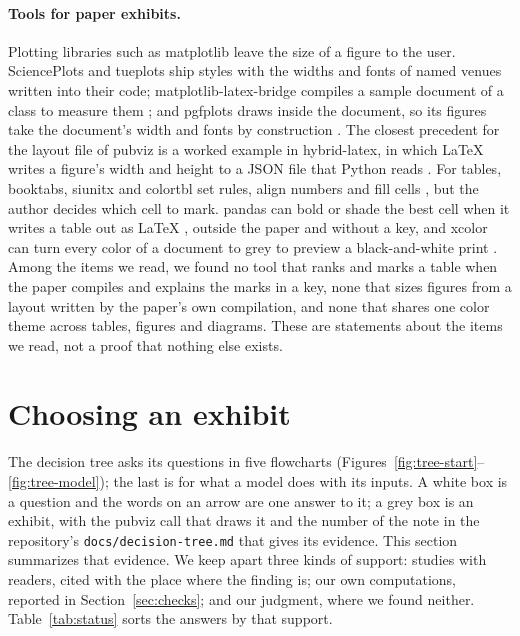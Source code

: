\documentclass[11pt]{article}
\newcommand\code[1]{\texttt{#1}}
\begin{document}
\paragraph{Tools for paper exhibits.} Plotting libraries such as matplotlib
\citep{hunter2007matplotlib} leave the size of a figure to the user.
SciencePlots and tueplots \citep{garrett_scienceplots,kramer_tueplots} ship
styles with the widths and fonts of named venues written into their code;
matplotlib-latex-bridge compiles a sample document of a class to measure
them \citep{vannucci_mlb}; and pgfplots draws inside the document, so its
figures take the document's width and fonts by construction
\citep{feuersaenger2026pgfplots}. The closest precedent for the layout file of
pubviz is a worked example in hybrid-latex, in which LaTeX writes a
figure's width and height to a JSON file that Python reads
\citep{brewin2018hybridlatex}. For tables, booktabs, siunitx and colortbl set
rules, align numbers and fill cells
\citep{fear2020booktabs,wright2026siunitx,carlisle2026colortbl}, but the
author decides which cell to mark. pandas can bold or shade the best cell
when it writes a table out as LaTeX \citep{pandas_styler_to_latex}, outside
the paper and without a key, and xcolor can turn every color of a document to
grey to preview a black-and-white print \citep{kern2024xcolor}. Among the
items we read, we found no tool that ranks and marks a table when the paper
compiles and explains the marks in a key, none that sizes figures from a
layout written by the paper's own compilation, and none that shares one color
theme across tables, figures and diagrams. These are statements about the
items we read, not a proof that nothing else exists.

\section{Choosing an exhibit}\label{sec:tree}

The decision tree asks its questions in five flowcharts
(Figures~\ref{fig:tree-start}--\ref{fig:tree-model}); the last is for what
a model does with its inputs. A white box is a
question and the words on an arrow are one answer to it; a grey box is an
exhibit, with the pubviz call that draws it and the number of the note in
the repository's \code{docs/decision-tree.md} that gives its evidence. This
section summarizes that evidence. We keep apart three kinds of support:
studies with readers, cited with the place where the finding is; our own
computations, reported in Section~\ref{sec:checks}; and our judgment, where
we found neither. Table~\ref{tab:status} sorts the answers by that support.
\end{document}
